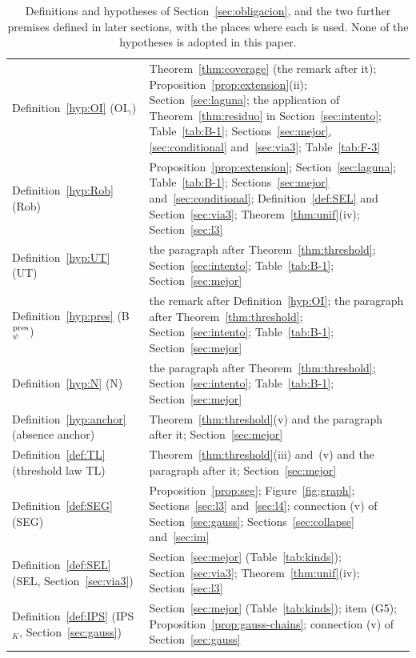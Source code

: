 \begin{table}[htbp]
\begin{tabular}{>{\raggedright\arraybackslash}p{}>{\raggedright\arraybackslash}p{}}
Definition~\ref{hyp:OI} (OI$_\gamma$) & Theorem~\ref{thm:coverage} (the remark after it); Proposition~\ref{prop:extension}(ii); Section~\ref{sec:laguna}; the application of Theorem~\ref{thm:residuo} in Section~\ref{sec:intento}; Table~\ref{tab:B-1}; Sections~\ref{sec:mejor}, \ref{sec:conditional} and~\ref{sec:via3}; Table~\ref{tab:F-3}\\
Definition~\ref{hyp:Rob} (Rob) & Proposition~\ref{prop:extension}; Section~\ref{sec:laguna}; Table~\ref{tab:B-1}; Sections~\ref{sec:mejor} and~\ref{sec:conditional}; Definition~\ref{def:SEL} and Section~\ref{sec:via3}; Theorem~\ref{thm:unif}(iv); Section~\ref{sec:l3}\\
Definition~\ref{hyp:UT} (UT) & the paragraph after Theorem~\ref{thm:threshold}; Section~\ref{sec:intento}; Table~\ref{tab:B-1}; Section~\ref{sec:mejor}\\
Definition~\ref{hyp:pres} (B$_\psi^{\rm pres}$) & the remark after Definition~\ref{hyp:OI}; the paragraph after Theorem~\ref{thm:threshold}; Section~\ref{sec:intento}; Table~\ref{tab:B-1}; Section~\ref{sec:mejor}\\
Definition~\ref{hyp:N} (N) & the paragraph after Theorem~\ref{thm:threshold}; Section~\ref{sec:intento}; Table~\ref{tab:B-1}; Section~\ref{sec:mejor}\\
Definition~\ref{hyp:anchor} (absence anchor) & Theorem~\ref{thm:threshold}(v) and the paragraph after it; Section~\ref{sec:mejor}\\
Definition~\ref{def:TL} (threshold law TL) & Theorem~\ref{thm:threshold}(iii) and~(v) and the paragraph after it; Section~\ref{sec:mejor}\\
Definition~\ref{def:SEG} (SEG) & Proposition~\ref{prop:seg}; Figure~\ref{fig:graph}; Sections~\ref{sec:l3} and~\ref{sec:l4}; connection (v) of Section~\ref{sec:gauss}; Sections~\ref{sec:collapse} and~\ref{sec:im}\\
\midrule
Definition~\ref{def:SEL} (SEL, Section~\ref{sec:via3}) & Section~\ref{sec:mejor} (Table~\ref{tab:kinds}); Section~\ref{sec:via3}; Theorem~\ref{thm:unif}(iv); Section~\ref{sec:l3}\\
Definition~\ref{def:IPS} (IPS$_K$, Section~\ref{sec:gauss}) & Section~\ref{sec:mejor} (Table~\ref{tab:kinds}); item (G5); Proposition~\ref{prop:gauss-chains}; connection (v) of Section~\ref{sec:gauss}\\
\bottomrule
\end{tabular}
\caption{Definitions and hypotheses of Section~\ref{sec:obligacion}, and the two further premises defined in later sections, with the places where each is used. None of the hypotheses is adopted in this paper.}\label{tab:corr-6}
\end{table}

